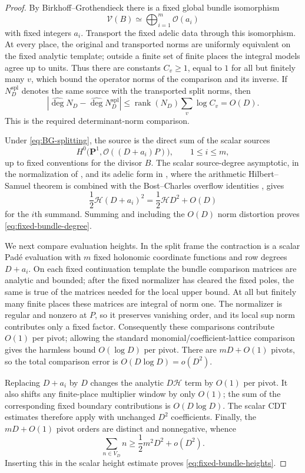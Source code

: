 \documentclass[11pt]{article}
\theoremstyle{definition}
\theoremstyle{remark}
\newcommand{\rank}{\operatorname{rank}}
\newcommand{\calO}{\mathcal O}
\newcommand{\calV}{\mathcal V}
\newcommand{\widehatdeg}{\widehat{\deg}}
\newcommand{\Energy}{\mathscr H}
\begin{document}
\begin{proof}
By Birkhoff--Grothendieck there is a fixed global bundle isomorphism
\begin{equation}\label{eq:BG-splitting}
 \calV(B)\simeq\bigoplus_{i=1}^m\calO(a_i)
\end{equation}
with fixed integers $a_i$.  Transport the fixed adelic data through this
isomorphism.  At every place, the original and transported norms are
uniformly equivalent on the fixed analytic template; outside a finite set of
finite places the integral models agree up to units.  Thus there are constants
$C_v\ge1$, equal to $1$ for all but finitely many $v$, which bound the
operator norms of the comparison and its inverse.  If
$N_D^{\mathrm{spl}}$ denotes the same source with the transported split norms,
then
\[
 \left|\widehatdeg N_D-\widehatdeg N_D^{\mathrm{spl}}\right|
 \le \rank(N_D)\sum_v\log C_v=O(D).
\]
This is the required determinant-norm comparison.

Under \eqref{eq:BG-splitting}, the source is the direct sum of the scalar
sources
\[
 H^0\bigl(\mathbf P^1,\calO((D+a_i)P)\bigr),
 \qquad 1\le i\le m,
\]
up to fixed conventions for the divisor $B$.  The scalar source-degree asymptotic, in the normalization of
\cite[(7.3.7)]{CDT2024}, and its adelic form in
\cite[Section~2.3 and the proof of Theorem~2.6]{CDT2025}, where the
arithmetic Hilbert--Samuel theorem is combined with the Bost--Charles overflow
identities \cite[Theorem~5.4.1 and Proposition~5.4.2]{BostCharles2022}, gives
\[
 \frac12\Energy(D+a_i)^2
 =\frac12\Energy D^2+O(D)
\]
for the $i$th summand.  Summing and including the $O(D)$ norm distortion
proves \eqref{eq:fixed-bundle-degree}.

We next compare evaluation heights.  In the split frame the contraction is a
scalar Pad\'e evaluation with $m$ fixed holonomic coordinate functions and
row degrees $D+a_i$.  On each fixed continuation template the bundle
comparison matrices are analytic and bounded; after the fixed normalizer has
cleared the fixed poles, the same is true of the matrices needed for the
local upper bound.  At all but finitely many finite places these matrices are
integral of norm one.  The normalizer is regular and nonzero at $P$, so it
preserves vanishing order, and its local sup norm contributes only a fixed
factor.  Consequently these comparisons contribute $O(1)$ per pivot;
allowing the standard monomial/coefficient-lattice comparison gives the
harmless bound $O(\log D)$ per pivot.  There are $mD+O(1)$ pivots, so the total comparison error is
$O(D\log D)=o(D^2)$.

Replacing $D+a_i$ by $D$ changes the analytic $D\Energy$ term by $O(1)$ per
pivot.  It also shifts any finite-place multiplier window by only $O(1)$;
the sum of the corresponding fixed boundary contributions is
$O(D\log D)$.  The scalar CDT estimates
\cite[(7.3.14)--(7.3.15)]{CDT2024} therefore apply with unchanged $D^2$
coefficients.  Finally, the $mD+O(1)$ pivot orders are distinct and
nonnegative, whence
\[
 \sum_{n\in V_D}n\ge\frac12m^2D^2+o(D^2).
\]
Inserting this in the scalar height estimate proves
\eqref{eq:fixed-bundle-heights}.
\end{proof}
\end{document}
